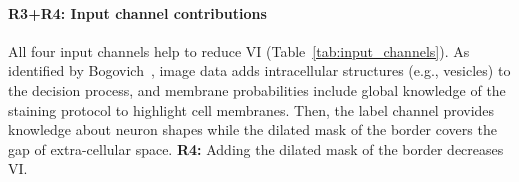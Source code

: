 \documentclass[10pt,twocolumn,letterpaper]{article}
\newcommand{\JT}[1]{\textcolor{red}{[JT: #1]}}
\begin{document}
\paragraph{R3+R4: Input channel contributions} All four input channels help to reduce VI (Table~\ref{tab:input_channels}). As identified by Bogovich~\etal, image data adds intracellular structures (e.g., vesicles) to the decision process, and membrane probabilities include global knowledge of the staining protocol to highlight cell membranes. Then, the label channel provides knowledge about neuron shapes while the dilated mask of the border covers the gap of extra-cellular space. \newline \noindent \textbf{R4:} Adding the dilated mask of the border decreases VI. %

\begin{table}[h]
\caption{Automatic selection on the AC4 subvolume ($p_t=0.95$) using our GP classifier; median VI reduction. The combination of all four input channels performs best.}
\vspace{-0.5cm}
\label{tab:input_channels}
\end{table}

\end{document}

